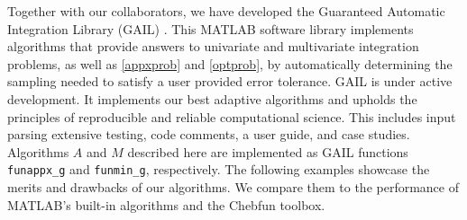 \documentclass[review]{elsarticle}
\theoremstyle{definition}
\newcommand{\funappxg}{\texttt{funappx\_g}\xspace}
\newcommand{\funming}{\texttt{funmin\_g}\xspace}
\begin{document}
Together with our collaborators, we have developed the Guaranteed Automatic
Integration Library (GAIL) \cite{ChoEtal15a}. This MATLAB software library
implements algorithms that provide answers to univariate and multivariate
integration problems, as well as \eqref{appxprob} and \eqref{optprob}, by
automatically determining the sampling needed to satisfy a user provided error
tolerance. GAIL is under active development. It implements our best adaptive
algorithms and upholds the principles of reproducible and reliable computational
science. This includes input parsing extensive testing, code comments, a user
guide, and case studies. Algorithms $A$ and $M$ described here are implemented
as GAIL functions \funappxg{} and \funming, respectively. The following examples
showcase the merits and drawbacks of our algorithms. We compare them to the
performance of MATLAB's built-in algorithms and the Chebfun toolbox.
\end{document}
